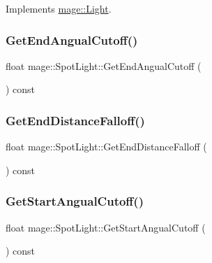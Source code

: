 Implements \hyperlink{classmage_1_1_light_aada77583072dd108e5cf86257225b768}{mage\+::\+Light}.

\hypertarget{classmage_1_1_spot_light_ac04202c48cb4c12334f9f55757a3d73a}{}\label{classmage_1_1_spot_light_ac04202c48cb4c12334f9f55757a3d73a} 
\subsubsection{\texorpdfstring{Get\+End\+Angual\+Cutoff()}{GetEndAngualCutoff()}}
{\footnotesize\ttfamily float mage\+::\+Spot\+Light\+::\+Get\+End\+Angual\+Cutoff (\begin{DoxyParamCaption}{ }\end{DoxyParamCaption}) const}

\hypertarget{classmage_1_1_spot_light_a3e6767992846e17a9bebb66519c30f19}{}\label{classmage_1_1_spot_light_a3e6767992846e17a9bebb66519c30f19} 
\subsubsection{\texorpdfstring{Get\+End\+Distance\+Falloff()}{GetEndDistanceFalloff()}}
{\footnotesize\ttfamily float mage\+::\+Spot\+Light\+::\+Get\+End\+Distance\+Falloff (\begin{DoxyParamCaption}{ }\end{DoxyParamCaption}) const}

\hypertarget{classmage_1_1_spot_light_abe143425da28281b7b72643bd2f1c5c2}{}\label{classmage_1_1_spot_light_abe143425da28281b7b72643bd2f1c5c2} 
\subsubsection{\texorpdfstring{Get\+Start\+Angual\+Cutoff()}{GetStartAngualCutoff()}}
{\footnotesize\ttfamily float mage\+::\+Spot\+Light\+::\+Get\+Start\+Angual\+Cutoff (\begin{DoxyParamCaption}{ }\end{DoxyParamCaption}) const}

